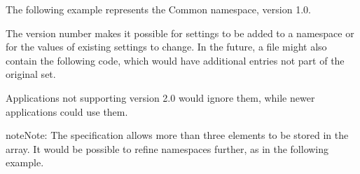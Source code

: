 \documentclass[letterpaper,12pt,english,openany,oneside]{sphinxmanual}
\begin{document}
The following example represents the Common namespace, version 1.0.

\begin{sphinxVerbatim}[commandchars=\\\{\}]
 \PYG{p}{[}    \PYG{p}{]}
\end{sphinxVerbatim}

The version number makes it possible for settings to be added to a namespace or for the values of existing settings to change. In the future, a file might also contain the following code, which would have additional entries not part of the original set.

\begin{sphinxVerbatim}[commandchars=\\\{\}]
 \PYG{p}{[}    \PYG{p}{]}
\end{sphinxVerbatim}

Applications not supporting version 2.0 would ignore them, while newer applications could use them.

\begin{sphinxadmonition}{note}{Note:}
The specification allows more than three elements to be stored in the array. It would be possible to refine namespaces further, as in the following example.
\end{sphinxadmonition}

\begin{sphinxVerbatim}[commandchars=\\\{\}]
 \PYG{p}{[}     \PYG{p}{]}
\end{sphinxVerbatim}
\end{document}
